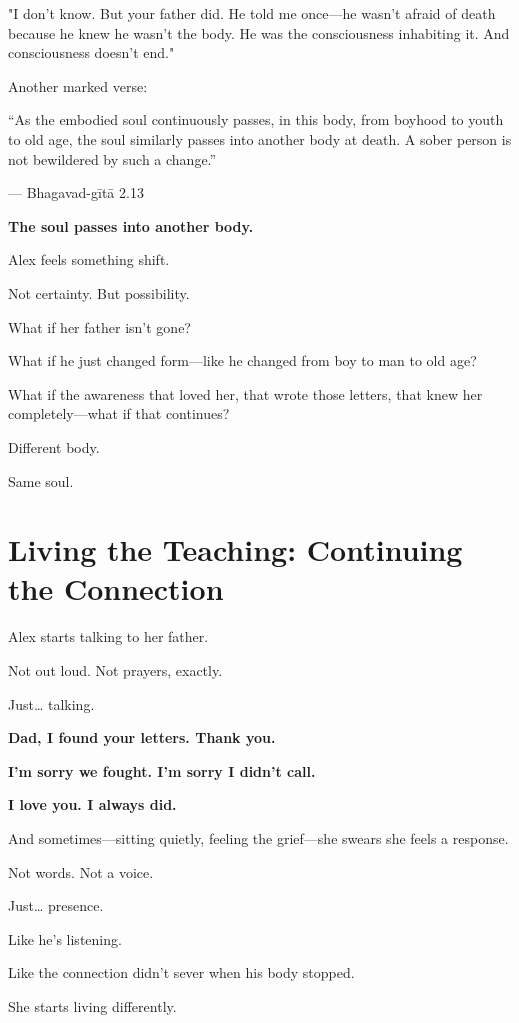 \documentclass[11pt,twoside]{book}
\begin{document}
"I don't know. But your father did. He told me once—he wasn't afraid of death because he knew he wasn't the body. He was the consciousness inhabiting it. And consciousness doesn't end."

Another marked verse:

\begin{pullquote}
``As the embodied soul continuously passes, in this body, from boyhood to youth to old age, the soul similarly passes into another body at death. A sober person is not bewildered by such a change.''

--- Bhagavad-gītā 2.13
\end{pullquote}

\textbf{The soul passes into another body.}

Alex feels something shift.

Not certainty. But possibility.

What if her father isn't gone?

What if he just changed form—like he changed from boy to man to old age?

What if the awareness that loved her, that wrote those letters, that knew her completely—what if that continues?

Different body.

Same soul.

\section*{Living the Teaching: Continuing the Connection}

Alex starts talking to her father.

Not out loud. Not prayers, exactly.

Just\ldots{} talking.

\textbf{Dad, I found your letters. Thank you.}

\textbf{I'm sorry we fought. I'm sorry I didn't call.}

\textbf{I love you. I always did.}

And sometimes—sitting quietly, feeling the grief—she swears she feels a response.

Not words. Not a voice.

Just\ldots{} presence.

Like he's listening.

Like the connection didn't sever when his body stopped.

She starts living differently.
\end{document}
